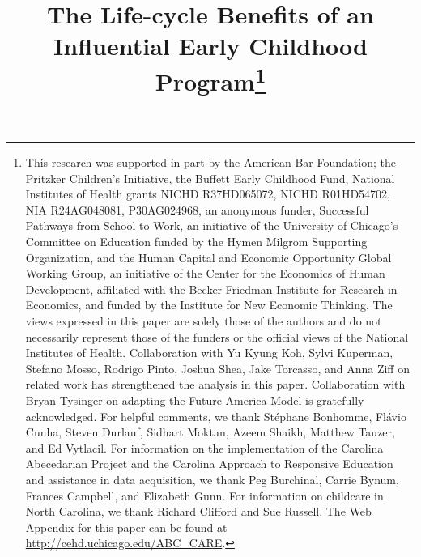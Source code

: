 


\newcommand*\leftright[2]{%
  \leavevmode
  \rlap{#1}%
  \hspace{0.5\linewidth}%
  #2}

\newcommand{\orth}{\ensuremath{\perp\!\!\!\perp}}%
\newcommand{\indep}{\orth}%
\newcommand{\notorth}{\ensuremath{\perp\!\!\!\!\!\!\diagup\!\!\!\!\!\!\perp}}%
\newcommand{\notindep}{\notorth}





\begin{titlepage}

\title{\Large \textbf{The Life-cycle Benefits of an Influential Early Childhood Program}\thanks{This research was supported in part by the American Bar Foundation; the Pritzker Children's Initiative, the Buffett Early Childhood Fund, National Institutes of Health grants NICHD R37HD065072, NICHD R01HD54702, NIA R24AG048081, P30AG024968, an anonymous funder, Successful Pathways from School to Work, an initiative of the University of Chicago's Committee on Education funded by the Hymen Milgrom Supporting Organization, and the Human Capital and Economic Opportunity Global Working Group, an initiative of the Center for the Economics of Human Development, affiliated with the Becker Friedman Institute for Research in Economics, and funded by the Institute for New Economic Thinking. The views expressed in this paper are solely those of the authors and do not necessarily represent those of the funders or the official views of the National Institutes of Health. Collaboration with Yu Kyung Koh, Sylvi Kuperman, Stefano Mosso, Rodrigo Pinto, Joshua Shea, Jake Torcasso, and Anna Ziff on related work has strengthened the analysis in this paper. Collaboration with Bryan Tysinger on adapting the Future America Model is gratefully acknowledged. For helpful comments, we thank St\'{e}phane Bonhomme, Fl\'{a}vio Cunha, Steven Durlauf, Sidhart Moktan, Azeem Shaikh, Matthew Tauzer, and Ed Vytlacil. For information on the implementation of the Carolina Abecedarian Project and the Carolina Approach to Responsive Education and assistance in data acquisition, we thank Peg Burchinal, Carrie Bynum, Frances Campbell, and Elizabeth Gunn. For information on childcare in North Carolina, we thank Richard Clifford and Sue Russell. The Web Appendix for this paper can be found at \url{http://cehd.uchicago.edu/ABC_CARE}.}}


\end{titlepage}
